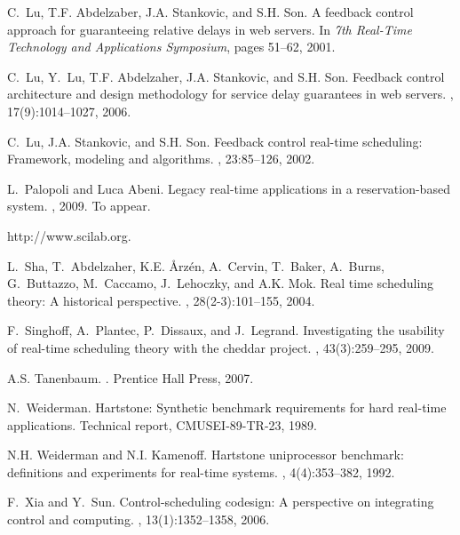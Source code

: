\documentclass[a4paper]{article}
\begin{document}
\begin{thebibliography}{10}
C.~Lu, T.F. Abdelzaber, J.A. Stankovic, and S.H. Son.
\newblock A feedback control approach for guaranteeing relative delays in web
  servers.
\newblock In {\em 7th Real-Time Technology and Applications Symposium}, pages
  51--62, 2001.

C.~Lu, Y.~Lu, T.F. Abdelzaher, J.A. Stankovic, and S.H. Son.
\newblock Feedback control architecture and design methodology for service
  delay guarantees in web servers.
,
  17(9):1014--1027, 2006.

C.~Lu, J.A. Stankovic, and S.H. Son.
\newblock Feedback control real-time scheduling: Framework, modeling and
  algorithms.
, 23:85--126, 2002.

L.~Palopoli and Luca Abeni.
\newblock Legacy real-time applications in a reservation-based system.
, 2009.
\newblock To appear.

http://www.scilab.org.

L.~Sha, T.~Abdelzaher, K.E. {\AA}rz\'en, A.~Cervin, T.~Baker, A.~Burns,
  G.~Buttazzo, M.~Caccamo, J.~Lehoczky, and A.K. Mok.
\newblock Real time scheduling theory: A historical perspective.
, 28(2-3):101--155, 2004.

F.~Singhoff, A.~Plantec, P.~Dissaux, and J.~Legrand.
\newblock Investigating the usability of real-time scheduling theory with the
  cheddar project.
, 43(3):259--295, 2009.

A.S. Tanenbaum.
.
\newblock Prentice Hall Press, 2007.

N.~Weiderman.
\newblock Hartstone: Synthetic benchmark requirements for hard real-time
  applications.
\newblock Technical report, CMUSEI-89-TR-23, 1989.

N.H. Weiderman and N.I. Kamenoff.
\newblock Hartstone uniprocessor benchmark: definitions and experiments for
  real-time systems.
, 4(4):353--382, 1992.

F.~Xia and Y.~Sun.
\newblock Control-scheduling codesign: A perspective on integrating control and
  computing.
,
  13(1):1352--1358, 2006.

\end{thebibliography}
 
\end{document}
